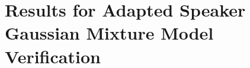 \chapter{Results for Adapted Speaker Gaussian Mixture Model Verification}
\label{apx:asgmm-verify-results}